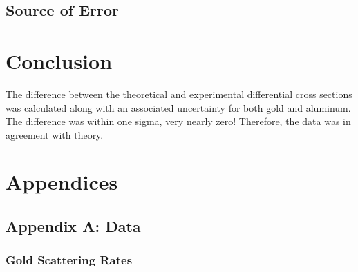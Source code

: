 \documentclass[a4paper]{article}
\begin{document}
\subsection{Source of Error}

\section{Conclusion}

\qq The difference between the theoretical and experimental differential cross
sections was calculated along with an associated uncertainty for both gold and
aluminum. The difference was within one sigma, very nearly zero! Therefore, the
data was in agreement with theory.

\qq 

\section{Appendices}

\subsection{Appendix A: Data}

\subsubsection{Gold Scattering Rates}
\end{document}
